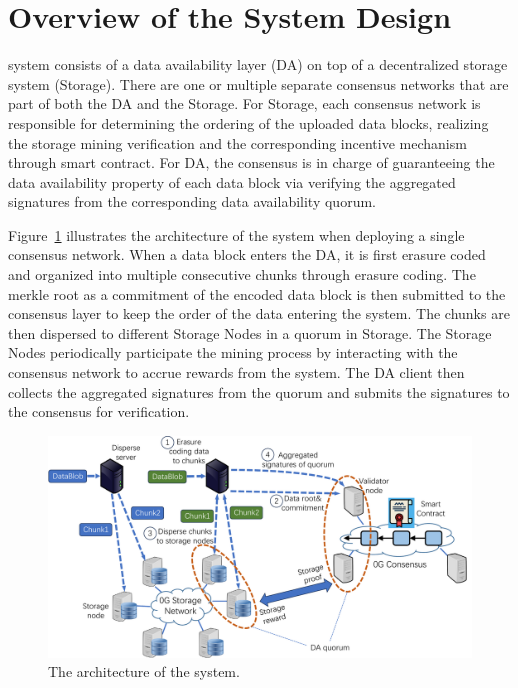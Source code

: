\section{Overview of the System Design}

\projabbrev system consists of a data availability layer (\projabbrev DA) on top of a decentralized storage system (\projabbrev Storage). 
There are one or multiple separate consensus networks that are part of both the \projabbrev DA and the \projabbrev Storage. 
For \projabbrev Storage, each consensus network is responsible for determining the ordering of the uploaded data blocks, realizing the storage mining verification and the corresponding incentive mechanism through smart contract. For \projabbrev DA, the consensus is in charge of guaranteeing the data availability property of each data block via verifying the aggregated signatures from the corresponding data availability quorum. 

Figure~\ref{fig:0gda} illustrates the architecture of the \projabbrev system when deploying a single consensus network. When a data block enters the \projabbrev DA, it is first erasure coded and organized into multiple consecutive chunks through erasure coding. The merkle root as a commitment of the encoded data block is then submitted to the consensus layer to keep the order of the data entering the system. The chunks are then dispersed to different Storage Nodes in a quorum in \projabbrev Storage. The Storage Nodes periodically participate the mining process by interacting with the consensus network to accrue rewards from the system. 
The DA client then collects the aggregated signatures from the quorum and submits the signatures to the consensus for verification.

\begin{figure}[H]	
	\includegraphics[width=\textwidth]{figure/0gda.pdf}
	\caption{The architecture of the \projabbrev system.}
	\label{fig:0gda}
\end{figure}

